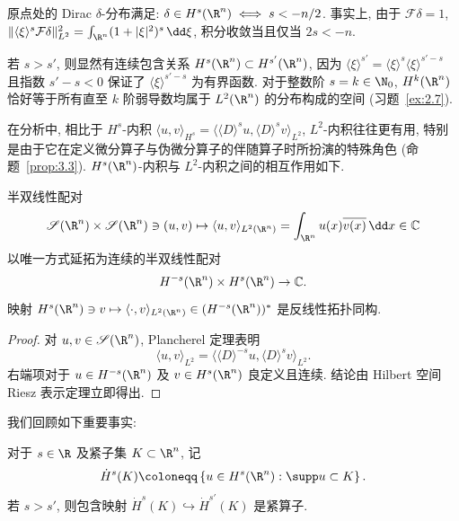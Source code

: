 \begin{example}\label{eg:2.15}
原点处的 Dirac $\delta$-分布满足: $\delta \in H^s(\R^n) \iff s < -n/2$. 事实上, 由于 $\mathcal{F} \delta = 1$, $\|\langle \xi \rangle^s \mathcal{F} \delta\|_{L^2}^2 = \int_{\R^n} (1 + |\xi|^2)^s \,\dd\xi$, 积分收敛当且仅当 $2s < -n$.
\end{example}

若 $s > s'$, 则显然有连续包含关系 $H^s(\R^n) \subset H^{s'}(\R^n)$, 因为 $\langle \xi \rangle^{s'} = \langle \xi \rangle^s \langle \xi \rangle^{s' - s}$ 且指数 $s' - s < 0$ 保证了 $\langle \xi \rangle^{s'-s}$ 为有界函数. 对于整数阶 $s = k \in \N_0$, $H^k(\R^n)$ 恰好等于所有直至 $k$ 阶弱导数均属于 $L^2(\R^n)$ 的分布构成的空间 (习题~\ref{ex:2.7}).

在分析中, 相比于 $H^s$-内积 $\langle u, v \rangle_{H^s} = \langle \langle D \rangle^s u, \langle D \rangle^s v \rangle_{L^2}$, $L^2$-内积往往更有用, 特别是由于它在定义微分算子与伪微分算子的伴随算子时所扮演的特殊角色 (命题~\ref{prop:3.3}). $H^s(\R^n)$-内积与 $L^2$-内积之间的相互作用如下.

\begin{lemma}[$H^s(\R^n)$ 的 $L^2$-对偶空间]\label{lemma:2.16}
半双线性配对
\begin{equation}\label{eq:2.36}
    \Schwartz(\R^n) \times \Schwartz(\R^n) \ni (u, v) \mapsto \langle u, v \rangle_{L^2(\R^n)} = \int_{\R^n} u(x) \overline{v(x)} \,\dd x \in \mathbb{C}
\end{equation}
以唯一方式延拓为连续的半双线性配对
\begin{equation}\label{eq:2.37}
    H^{-s}(\R^n) \times H^s(\R^n) \to \mathbb{C}.
\end{equation}
映射 $H^s(\R^n) \ni v \mapsto \langle \cdot, v \rangle_{L^2(\R^n)} \in (H^{-s}(\R^n))^*$ 是反线性拓扑同构.
\end{lemma}

\begin{proof}
对 $u, v \in \Schwartz(\R^n)$, Plancherel 定理表明
\begin{equation}\label{eq:2.38}
    \langle u, v \rangle_{L^2} = \langle \langle D \rangle^{-s} u, \langle D \rangle^s v \rangle_{L^2}.
\end{equation}
右端项对于 $u \in H^{-s}(\R^n)$ 及 $v \in H^s(\R^n)$ 良定义且连续. 结论由 Hilbert 空间 Riesz 表示定理立即得出.
\end{proof}

我们回顾如下重要事实:

\begin{theorem}\label{thm:2.17}
对于 $s \in \R$ 及紧子集 $K \subset \R^n$, 记
\begin{equation}\label{eq:2.39}
    \dot{H}^s(K) \defeq \left\{ u \in H^s(\R^n) : \supp u \subset K \right\}.
\end{equation}
若 $s > s'$, 则包含映射 $\dot{H}^s(K) \hookrightarrow \dot{H}^{s'}(K)$ 是紧算子.
\end{theorem}

